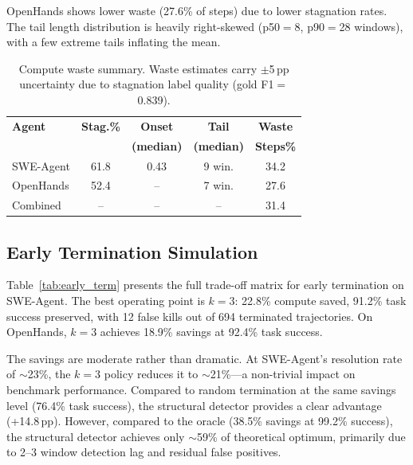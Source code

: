 \documentclass[11pt,a4paper]{article}
\begin{document}
OpenHands shows lower waste (27.6\% of steps) due to lower stagnation rates.
The tail length distribution is heavily right-skewed (p50${=}$8, p90${=}$28 windows), with a few extreme tails inflating the mean.

\begin{table}[t]
\centering
\small
\begin{tabular}{lcccc}
\toprule
\textbf{Agent} & \textbf{Stag.\%} & \textbf{Onset} & \textbf{Tail} & \textbf{Waste} \\
 & & \textbf{(median)} & \textbf{(median)} & \textbf{Steps\%} \\
\midrule
SWE-Agent & 61.8 & 0.43 & 9 win. & 34.2 \\
OpenHands & 52.4 & -- & 7 win. & 27.6 \\
Combined & -- & -- & -- & 31.4 \\
\bottomrule
\end{tabular}
\caption{Compute waste summary. Waste estimates carry ${\pm}$5\,pp uncertainty due to stagnation label quality (gold F1${=}$0.839).}
\label{tab:waste}
\end{table}

\subsection{Early Termination Simulation}

Table~\ref{tab:early_term} presents the full trade-off matrix for early termination on SWE-Agent.
The best operating point is $k{=}3$: 22.8\% compute saved, 91.2\% task success preserved, with 12 false kills out of 694 terminated trajectories.
On OpenHands, $k{=}3$ achieves 18.9\% savings at 92.4\% task success.

The savings are moderate rather than dramatic. At SWE-Agent's resolution rate of ${\sim}$23\%, the $k{=}3$ policy reduces it to ${\sim}$21\%---a non-trivial impact on benchmark performance.
Compared to random termination at the same savings level (76.4\% task success), the structural detector provides a clear advantage (+14.8\,pp).
However, compared to the oracle (38.5\% savings at 99.2\% success), the structural detector achieves only ${\sim}$59\% of theoretical optimum, primarily due to 2--3 window detection lag and residual false positives.
\end{document}
